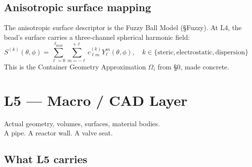 \documentclass[11pt, a4paper, oneside]{article}
\theoremstyle{definition}
\begin{document}
\subsection{Anisotropic surface mapping}

The anisotropic surface descriptor is the Fuzzy Ball Model (§Fuzzy).
At L4, the bead's surface carries a three-channel spherical harmonic
field:
\[
  S^{(k)}(\theta, \phi) = \sum_{\ell=0}^{\ell_{\max}}
                           \sum_{m=-\ell}^{+\ell}
                           c_{\ell m}^{(k)} Y_\ell^m(\theta, \phi),
  \quad k \in \{\text{steric}, \text{electrostatic}, \text{dispersion}\}
\]
This is the Container Geometry Approximation $\Omega_i$ from §0,
made concrete.

\section{L5 — Macro / CAD Layer}
\label{sec:l5}

\begin{tcolorbox}[colback=l5col, colframe=violet!60!black,
  title={L5 — Macro / CAD},fonttitle=\bfseries\small]
  Actual geometry, volumes, surfaces, material bodies.\\
  A pipe. A reactor wall. A valve seat.
\end{tcolorbox}

\subsection{What L5 carries}
\end{document}
